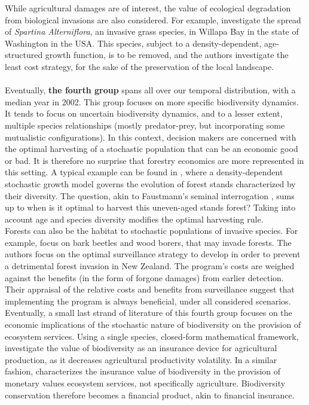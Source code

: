 While agricultural damages are of interest, the value of ecological degradation from biological invasions are also considered. For example, \cite{Taylor2004} investigate the spread of \textit{Spartina Alterniflora}, an invasive grass species, in Willapa Bay in the state of Washington in the USA. This species, subject to a density-dependent, age-structured growth function, is to be removed, and the authors investigate the least cost strategy, for the sake of the preservation of the local landscape. 
\\\\
\hspace*{1.5em}Eventually, \textbf{ the fourth group} spans all over our temporal distribution, with a median year in 2002. This group focuses on more specific biodiversity dynamics. It tends to focus on uncertain biodiversity dynamics, and to a lesser extent, multiple species relationships (mostly predator-prey, but incorporating some mutualistic configurations). In this context, decision makers are concerned with the optimal harvesting of a stochastic population that can be an economic good or bad. It is therefore no surprise that forestry economics are more represented in this setting. A typical example can be found in \cite{Lin1996}, where a density-dependent stochastic growth model governs the evolution of forest stands characterized by their diversity. The question, akin to Faustmann's  seminal interrogation \citep{Faustmann}, sums up to when is it optimal to harvest this uneven-aged stands forest? Taking into account age and species diversity modifies the optimal harvesting rule. 
\\
Forests can also be the habitat to stochastic populations of invasive species. For example, \cite{EpanchinNiell2014} focus on bark beetles and wood borers, that may invade forests. The authors focus on the optimal surveillance strategy to develop in order to prevent a detrimental forest invasion in New Zealand. The program's costs are weighed against the benefits (in the form of forgone damages) from earlier detection. Their appraisal of the relative costs and benefits from surveillance suggest that implementing the program is always beneficial, under all considered scenarios.
Eventually, a small last strand of literature of this fourth group focuses on the economic implications of the stochastic nature of biodiversity on the provision of ecosystem services. Using a single species, closed-form mathematical framework, \cite{AugeraudVeron2019} investigate the value of biodiversity as an insurance device for agricultural production, as it decreases agricultural productivity volatility. In a similar fashion, \cite{Baumgartner2007} characterizes the insurance value of biodiversity in the provision of monetary values ecosystem services, not specifically agriculture. Biodiversity conservation therefore becomes a financial product, akin to financial insurance. 
